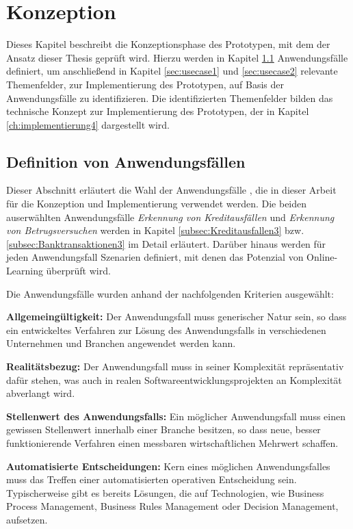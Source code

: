 \chapter{Konzeption}
\label{ch:Konzeption3}

Dieses Kapitel beschreibt die Konzeptionsphase des Prototypen, mit dem der Ansatz dieser Thesis geprüft wird. Hierzu werden in Kapitel \ref{sec:Anwendungsfalle3} Anwendungsfälle  definiert, um anschließend in Kapitel \ref{sec:usecase1} und \ref{sec:usecase2} relevante Themenfelder, zur Implementierung des Prototypen, auf Basis der Anwendungsfälle zu identifizieren. Die identifizierten Themenfelder bilden das technische Konzept zur Implementierung des Prototypen, der in Kapitel \ref{ch:implementierung4} dargestellt wird.

\section{Definition von Anwendungsfällen}
\label{sec:Anwendungsfalle3}

Dieser Abschnitt erläutert die Wahl der Anwendungsfälle , die in dieser Arbeit für die Konzeption und Implementierung verwendet werden. Die beiden auserwählten Anwendungsfälle \emph{Erkennung von Kreditausfällen} und \emph{Erkennung von Betrugsversuchen} werden in Kapitel \ref{subsec:Kreditausfallen3} bzw. \ref{subsec:Banktransaktionen3} im Detail erläutert. Darüber hinaus werden für jeden Anwendungsfall Szenarien definiert, mit denen das Potenzial von Online-Learning überprüft wird.   

Die Anwendungsfälle wurden anhand der nachfolgenden Kriterien ausgewählt:  

\begin{itemize*}
\item \textbf{Allgemeingültigkeit:} Der Anwendungsfall muss generischer Natur sein, so dass ein entwickeltes Verfahren zur Lösung des Anwendungsfalls in verschiedenen Unternehmen und Branchen angewendet werden kann.      
\item \textbf{Realitätsbezug:} Der Anwendungsfall muss in seiner Komplexität repräsentativ dafür stehen, was auch in realen Softwareentwicklungsprojekten an Komplexität abverlangt wird.     
\item \textbf{Stellenwert des Anwendungsfalls:} Ein möglicher Anwendungsfall muss einen gewissen Stellenwert innerhalb einer Branche besitzen, so dass neue, besser funktionierende Verfahren einen messbaren wirtschaftlichen Mehrwert schaffen.
\item \textbf{Automatisierte Entscheidungen:} Kern eines möglichen Anwendungsfalles muss das Treffen einer automatisierten operativen Entscheidung sein. Typischerweise gibt es bereits Lösungen, die auf Technologien, wie Business Process Management, Business Rules Management oder Decision Management, aufsetzen.  
\end{itemize*}

